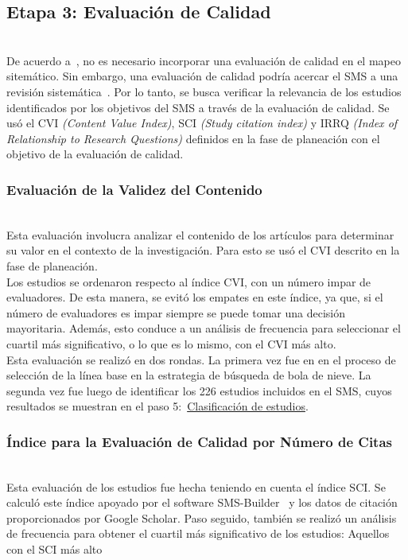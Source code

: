 \subsection{Etapa 3: Evaluación de Calidad}
\mbox{}\\
De acuerdo a~\cite{8747000}, no es necesario incorporar una evaluación de calidad en el mapeo sitemático. Sin embargo, una evaluación de calidad podría acercar el SMS a una revisión sistemática~\cite{10.1145/2601248.2601268}. Por lo tanto, se busca verificar la relevancia de los estudios identificados por los objetivos del SMS a través de la evaluación de calidad. Se usó el CVI \textit{(Content Value Index)}, SCI \textit{(Study citation index)} y IRRQ \textit{(Index of Relationship to Research Questions)} definidos en la fase de planeación con el objetivo de la evaluación de calidad.\\

\subsubsection{Evaluación de la Validez del Contenido}
\mbox{}\\
Esta evaluación involucra analizar el contenido de los artículos para determinar su valor en el contexto de la investigación. Para esto se usó el CVI descrito en la fase de planeación. \\
Los estudios se ordenaron respecto al índice CVI, con un número impar de evaluadores. De esta manera, se evitó los empates en este índice, ya que, si el número de evaluadores es impar siempre se puede tomar una decisión mayoritaria. Además, esto conduce a un análisis de frecuencia para seleccionar el cuartil más significativo, o lo que es lo mismo, con el CVI más alto. \\
Esta evaluación se realizó en dos rondas. La primera vez fue en en el proceso de selección de la línea base en la estrategia de búsqueda de bola de nieve. La segunda vez fue luego de identificar los 226 estudios incluidos en el SMS, cuyos resultados se muestran en el paso 5:~\hyperref[sec:clasificacion-estudios]{Clasificación de estudios}.\\

\subsubsection{Índice para la Evaluación de Calidad por Número de Citas}
\mbox{}\\
Esta evaluación de los estudios fue hecha teniendo en cuenta el índice SCI. Se calculó este índice apoyado por el software SMS-Builder~\cite{candela2020smsbuilder} y los datos de citación proporcionados por Google Scholar. Paso seguido, también se realizó un análisis de frecuencia para obtener el cuartil más significativo de los estudios: Aquellos con el SCI más alto \\

